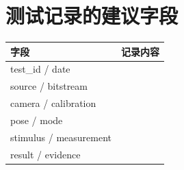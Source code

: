 \section{测试记录的建议字段}
\begin{center}
\small
\begin{tabularx}{\textwidth}{p{3cm}Y}
\toprule
字段 & 记录内容 \\
\midrule
test\_id / date &  \\
source / bitstream &  \\
camera / calibration &  \\
pose / mode &  \\
stimulus / measurement &  \\
result / evidence &  \\
\bottomrule
\end{tabularx}
\end{center}
